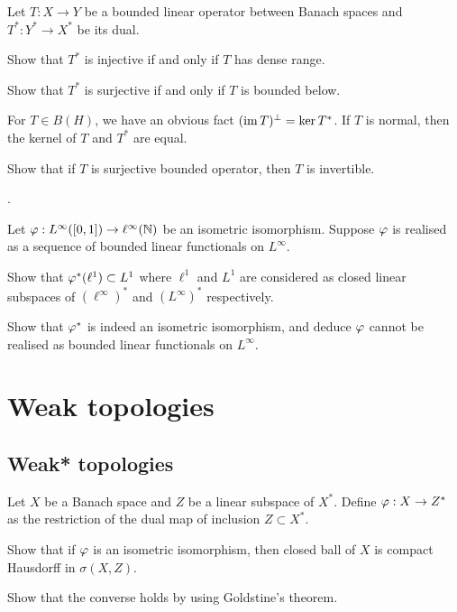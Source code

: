 \documentclass{../note}
\begin{document}
\begin{prb}
Let $T:X\to Y$ be a bounded linear operator between Banach spaces and $T^*:Y^*\to X^*$ be its dual.
\begin{parts}
\item
Show that $T^*$ is injective if and only if $T$ has dense range.
\item
Show that $T^*$ is surjective if and only if $T$ is bounded below.
\end{parts}
\end{prb}

\begin{prb}
For $T\in B(H)$, we have an obvious fact $(\operatorname{im} T)^\perp=\ker T^*$.
If $T$ is normal, then the kernel of $T$ and $T^*$ are equal.
\begin{parts}
\item
Show that if $T$ is surjective bounded operator, then $T$ is invertible.
\end{parts}
\end{prb}


\begin{prb}
.
\end{prb}


\begin{prb}
Let $\varphi:L^\infty([0,1])\to\ell^\infty(\mathbb{N})$ be an isometric isomorphism.
Suppose $\varphi$ is realised as a sequence of bounded linear functionals on $L^\infty$.
\begin{parts}
\item
Show that $\varphi^*(\ell^1)\subset L^1$ where $\ell^1$ and $L^1$ are considered as closed linear subspaces of $(\ell^\infty)^*$ and $(L^\infty)^*$ respectively.
\item Show that $\varphi^*$ is indeed an isometric isomorphism, and deduce $\varphi$ cannot be realised as bounded linear functionals on $L^\infty$.
\end{parts}
\end{prb}


\part{Weak topologies}
\chapter{Weak* topologies}

\begin{prb}
Let $X$ be a Banach space and $Z$ be a linear subspace of $X^*$.
Define $\varphi:X\to Z^*$ as the restriction of the dual map of inclusion $Z\subset X^*$.
\begin{parts}
\item
Show that if $\varphi$ is an isometric isomorphism, then closed ball of $X$ is compact Hausdorff in $\sigma(X,Z)$.
\item Show that the converse holds by using Goldstine's theorem.
\end{parts}
\end{prb}
\end{document}
